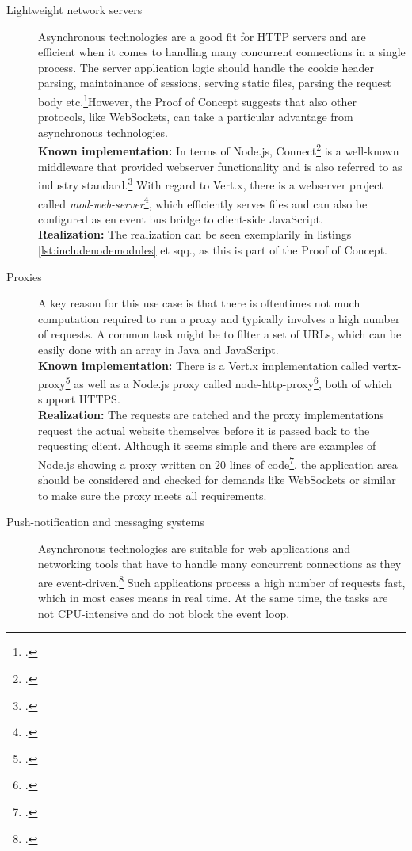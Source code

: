 \begin{description}
  
  \item[Lightweight network servers] Asynchronous technologies are a good fit for HTTP servers and are efficient when it comes to handling many concurrent connections in a single process. The server application logic should handle the cookie header parsing, maintainance of sessions, serving static files, parsing the request body etc.\footcite[Cf.][197 et seq,]{teixeira_2012}However, the Proof of Concept suggests that also other protocols, like WebSockets, can take a particular advantage from asynchronous technologies.\\
\textbf{Known implementation:} In terms of Node.js, Connect\footcite[Cf.][]{Odell_2012} is a well-known middleware that provided webserver functionality and is also referred to as industry standard.\footcite[Cf.][145]{Roden_2012} With regard to Vert.x, there is a webserver project called \textit{mod-web-server}\footcite[Cf.][]{vertxmodwebserver_2013}, which efficiently serves files and can also be configured as en event bus bridge to client-side JavaScript.\\
\textbf{Realization:} The realization can be seen exemplarily in listings \ref{lst:includenodemodules} et sqq., as this is part of the Proof of Concept.
  \item[Proxies] A key reason for this use case is that there is oftentimes not much computation required to run a proxy and typically involves a high number of requests. A common task might be to filter a set of URLs, which can be easily done with an array in Java and JavaScript.\\
\textbf{Known implementation:} There is a Vert.x implementation called vertx-proxy\footcite[Cf.][]{vertxproxy} as well as a Node.js proxy called node-http-proxy\footcite[Cf.][]{nodeproxy}, both of which support HTTPS.\\
\textbf{Realization:} The requests are catched and the proxy implementations request the actual website themselves before it is passed back to the requesting client. Although it seems simple and there are examples of Node.js showing a proxy written on 20 lines of code\footcite[Cf.][]{krumins_nodeproxy}, the application area should be considered and checked for demands like WebSockets or similar to make sure the proxy meets all requirements.
  \item[Push-notification and messaging systems] Asynchronous technologies are suitable for web applications and networking tools that have to handle many concurrent connections as they are event-driven.\footcite[Cf.][17]{teixeira_2012} Such applications process a high number of requests fast, which in most cases means in real time. At the same time, the tasks are not CPU-intensive and do not block the event loop. \\

\end{description}
